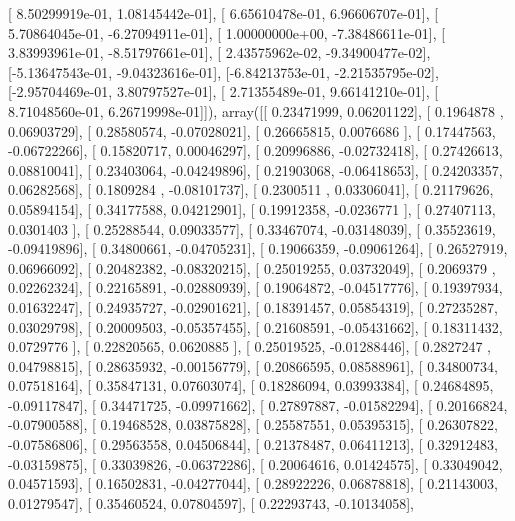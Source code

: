 \documentclass{article}
\begin{document}
       [ 8.50299919e-01,  1.08145442e-01],
       [ 6.65610478e-01,  6.96606707e-01],
       [ 5.70864045e-01, -6.27094911e-01],
       [ 1.00000000e+00, -7.38486611e-01],
       [ 3.83993961e-01, -8.51797661e-01],
       [ 2.43575962e-02, -9.34900477e-02],
       [-5.13647543e-01, -9.04323616e-01],
       [-6.84213753e-01, -2.21535795e-02],
       [-2.95704469e-01,  3.80797527e-01],
       [ 2.71355489e-01,  9.66141210e-01],
       [ 8.71048560e-01,  6.26719998e-01]]), array([[ 0.23471999,  0.06201122],
       [ 0.1964878 ,  0.06903729],
       [ 0.28580574, -0.07028021],
       [ 0.26665815,  0.0076686 ],
       [ 0.17447563, -0.06722266],
       [ 0.15820717,  0.00046297],
       [ 0.20996886, -0.02732418],
       [ 0.27426613,  0.08810041],
       [ 0.23403064, -0.04249896],
       [ 0.21903068, -0.06418653],
       [ 0.24203357,  0.06282568],
       [ 0.1809284 , -0.08101737],
       [ 0.2300511 ,  0.03306041],
       [ 0.21179626,  0.05894154],
       [ 0.34177588,  0.04212901],
       [ 0.19912358, -0.0236771 ],
       [ 0.27407113,  0.0301403 ],
       [ 0.25288544,  0.09033577],
       [ 0.33467074, -0.03148039],
       [ 0.35523619, -0.09419896],
       [ 0.34800661, -0.04705231],
       [ 0.19066359, -0.09061264],
       [ 0.26527919,  0.06966092],
       [ 0.20482382, -0.08320215],
       [ 0.25019255,  0.03732049],
       [ 0.2069379 ,  0.02262324],
       [ 0.22165891, -0.02880939],
       [ 0.19064872, -0.04517776],
       [ 0.19397934,  0.01632247],
       [ 0.24935727, -0.02901621],
       [ 0.18391457,  0.05854319],
       [ 0.27235287,  0.03029798],
       [ 0.20009503, -0.05357455],
       [ 0.21608591, -0.05431662],
       [ 0.18311432,  0.0729776 ],
       [ 0.22820565,  0.0620885 ],
       [ 0.25019525, -0.01288446],
       [ 0.2827247 ,  0.04798815],
       [ 0.28635932, -0.00156779],
       [ 0.20866595,  0.08588961],
       [ 0.34800734,  0.07518164],
       [ 0.35847131,  0.07603074],
       [ 0.18286094,  0.03993384],
       [ 0.24684895, -0.09117847],
       [ 0.34471725, -0.09971662],
       [ 0.27897887, -0.01582294],
       [ 0.20166824, -0.07900588],
       [ 0.19468528,  0.03875828],
       [ 0.25587551,  0.05395315],
       [ 0.26307822, -0.07586806],
       [ 0.29563558,  0.04506844],
       [ 0.21378487,  0.06411213],
       [ 0.32912483, -0.03159875],
       [ 0.33039826, -0.06372286],
       [ 0.20064616,  0.01424575],
       [ 0.33049042,  0.04571593],
       [ 0.16502831, -0.04277044],
       [ 0.28922226,  0.06878818],
       [ 0.21143003,  0.01279547],
       [ 0.35460524,  0.07804597],
       [ 0.22293743, -0.10134058],
\end{document}
